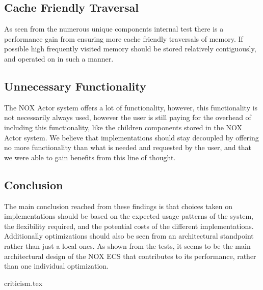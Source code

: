 \subsection{Cache Friendly Traversal}
As seen from the numerous unique components internal test there is a performance gain from
ensuring more cache friendly traversals of memory.
If possible high frequently visited memory should be stored relatively contiguously,
and operated on in such a manner.

\subsection{Unnecessary Functionality}
The NOX Actor system offers a lot of functionality, however, this functionality is not necessarily always used,
however the user is still paying for the overhead of including this functionality, like the children components
stored in the NOX Actor system.
We believe that implementations should stay decoupled by offering no more functionality than what is needed
and requested by the user, and that we were able to gain benefits from this line of thought.

\subsection{Conclusion}
The main conclusion reached from these findings is that choices taken on implementations
should be based on the expected usage patterns of the system, the flexibility required,
and the potential costs of the different implementations.
Additionally optimizations should also be seen from an architectural standpoint rather than
just a local ones. As shown from the tests, it seems to be the main architectural design
of the NOX ECS that contributes to its performance, rather than one individual optimization.

{criticism.tex}
